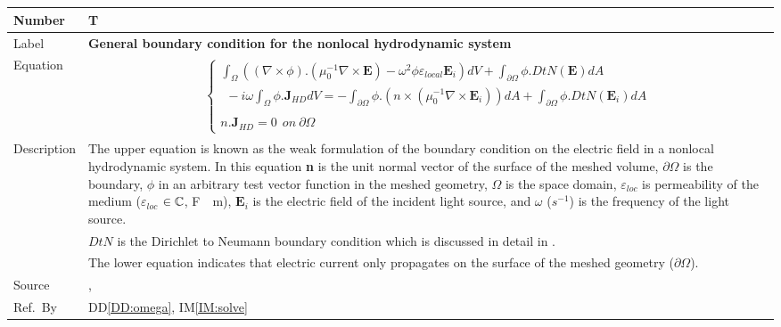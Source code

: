 \documentclass[12pt]{article}
\newcommand{\colBwidth}{0.82\textwidth} \newcommand{\colCwidth}{0.1\textwidth}
\begin{document}
	~\newline
	
	~\newline
	
	\noindent \begin{minipage}{\textwidth} \renewcommand*{\arraystretch}{1.5}
		\begin{tabular}{| p{\colAwidth} | p{\colBwidth}|} \hline \rowcolor[gray]{0.9}
			Number& T{theorynum}\thetheorynum \label{TM:boundary}\\ \hline
			Label&\bf General boundary condition for the nonlocal hydrodynamic system  \\
			\hline Equation& \begin{equation} \label{eq:boundary} \begin{gathered}
					\begin{cases} \int_\Omega ((\nabla \times \phi).(\mu^{-1}_{0} \nabla \times
						\textbf{E})- \omega^2\phi \varepsilon_{local} \textbf{E}_i)dV + \int_{\partial
							\Omega} \phi . DtN(\textbf{E})dA\\ \ \ - i\omega \int_\Omega \phi .
						\textbf{J}_{HD}dV =  -\int_{\partial \Omega} \phi.(n \times (\mu^{-1}_0 \nabla
						\times \textbf{E}_i))dA + \int_{\partial \Omega} \phi.DtN(\textbf{E}_i)dA \\ \\
						n.\textbf{J}_{HD}=0 \ \ on \ \partial \Omega \end{cases} \end{gathered} 
			\end{equation} \\
			
			
			\hline Description & The upper equation is known as the weak formulation of
			the boundary condition on the electric field in a nonlocal hydrodynamic
			system. In this equation \textbf{n} is the unit normal vector of the surface
			of the meshed volume, $\partial \Omega$ is the boundary, $\phi$ in an arbitrary test
			vector function in the meshed geometry, $\Omega$ is the space domain, $\varepsilon_{loc}$
			is permeability of the medium ($\varepsilon_{loc}$ $\in \Bbb C$, \si{\farad
				\per \meter}), $\textbf{E}_i$ is the electric field of the incident light
			source, and $\omega$ ($s^{-1}$) is the frequency of the light source.
			\\ &$DtN$ is the Dirichlet to Neumann boundary condition which is discussed in
			detail in \cite{monk2003finite}. \\ & The lower equation indicates that electric current only propagates on the
			surface of the meshed geometry ($\partial \Omega$). \\ \hline Source &
			\cite{hiremath2012numerical}, \cite{monk2003finite} \\ %
			\hline Ref.\ By & DD\ref{DD:omega}, IM\ref{IM:solve}\\ \hline \end{tabular}
	\end{minipage}\\
	
\end{document}
